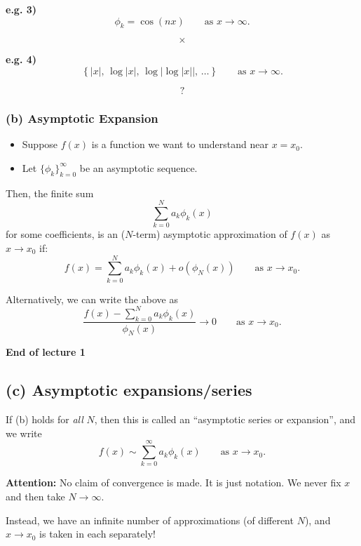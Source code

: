 \documentclass[11pt,a4paper]{article}
\begin{document}
\medskip

\noindent\textbf{e.g. 3)}
\[
\phi_k=\cos(nx)
\qquad \text{as }x\to\infty.
\]

\[
\times
\]

\medskip

\noindent\textbf{e.g. 4)}
\[
\left\{
|x|,\,
\log|x|,\,
\log|\log|x||,\,
\ldots
\right\}
\qquad \text{as }x\to\infty.
\]

\[
?
\]


\subsubsection*{(b) Asymptotic Expansion}

\begin{itemize}
    \item Suppose $f(x)$ is a function we want to understand near $x=x_0$.

    \item Let $\{\phi_k\}_{k=0}^{\infty}$ be an asymptotic sequence.
\end{itemize}

Then, the finite sum
\[
\sum_{k=0}^{N}a_k\phi_k(x)
\]
for some coefficients, is an ($N$-term) asymptotic approximation of $f(x)$ as $x\to x_0$ if:
\[
\boxed{
f(x)=\sum_{k=0}^{N}a_k\phi_k(x)+o(\phi_N(x))
}
\qquad \text{as }x\to x_0.
\]

Alternatively, we can write the above as
\[
\boxed{
\frac{f(x)-\displaystyle\sum_{k=0}^{N}a_k\phi_k(x)}
{\phi_N(x)}
\longrightarrow 0
}
\qquad \text{as }x\to x_0.
\]

\begin{center}
    \textbf{End of lecture 1}
\end{center}

\subsection*{(c) Asymptotic expansions/series}

If (b) holds for \emph{all} \(N\), then this is called an
``asymptotic series or expansion'', and we write
\[
f(x) \sim \sum_{k=0}^{\infty} a_k \phi_k(x)
\qquad \text{as } x \to x_0.
\]

\noindent
\textbf{Attention:} No claim of convergence is made. It is just notation.
We never fix \(x\) and then take \(N \to \infty\).

Instead, we have an infinite number of approximations (of different \(N\)),
and \(x \to x_0\) is taken in each separately!
\end{document}
